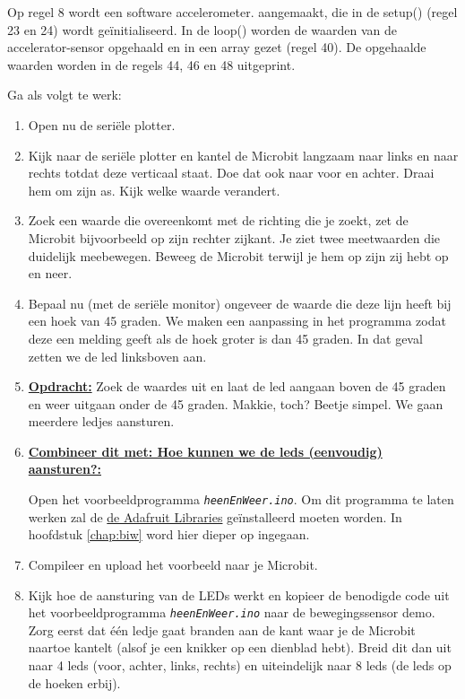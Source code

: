 Op regel 8 wordt een software accelerometer. aangemaakt, die in de \textcolor{OliveGreen}{setup}()  (regel 23 en 24) wordt geïnitialiseerd. In de \textcolor{OliveGreen}{loop}() worden de waarden van de accelerator-sensor opgehaald en in een array gezet (regel 40).  
De opgehaalde waarden worden in de regels 44, 46 en 48 uitgeprint.

Ga als volgt te werk:
\begin{enumerate}
\item Open nu de seriële plotter.
\item Kijk naar de seriële plotter en kantel de Microbit langzaam naar links en naar rechts totdat deze verticaal staat. Doe dat ook naar voor en achter. Draai hem om zijn as. Kijk welke waarde verandert.
\item Zoek een waarde die overeenkomt met de richting die je zoekt, zet de Microbit bijvoorbeeld op zijn rechter zijkant. Je ziet twee meetwaarden die duidelijk meebewegen. Beweeg de Microbit terwijl je hem op zijn zij hebt op en neer. 

\item Bepaal nu (met de seriële monitor) ongeveer de waarde die deze lijn heeft bij een hoek van 45 graden. We maken een aanpassing in het programma zodat deze een melding geeft als de hoek groter is dan 45 graden. In dat geval zetten we de led linksboven aan.
\item \textbf{\underline{Opdracht:}} Zoek de waardes uit en laat de led aangaan boven de 45 graden en weer uitgaan onder de 45 graden. Makkie, toch? Beetje simpel. We gaan meerdere ledjes aansturen.

\item \textbf{\underline{Combineer dit met: Hoe kunnen we de leds (eenvoudig) aansturen?: }}

Open het voorbeeldprogramma \texttt{\textit{heenEnWeer.ino}}. Om dit programma te laten werken zal de 	\href{https://learn.adafruit.com/use-micro-bit-with-arduino/adafruit-libraries}{de Adafruit Libraries}
geïnstalleerd moeten worden. In hoofdstuk \ref{chap:biw} word hier dieper op ingegaan.
\item Compileer en upload het voorbeeld naar je Microbit.
\item Kijk hoe de aansturing van de LEDs werkt en kopieer de benodigde code uit het voorbeeldprogramma \texttt{\textit{heenEnWeer.ino}} naar de bewegingssensor demo. Zorg eerst dat één ledje gaat branden aan de kant waar je de Microbit naartoe kantelt (alsof je een knikker op een dienblad hebt). Breid dit dan uit naar 4 leds (voor, achter, links, rechts) en uiteindelijk naar 8 leds (de leds op de hoeken erbij). 


\end{enumerate}
